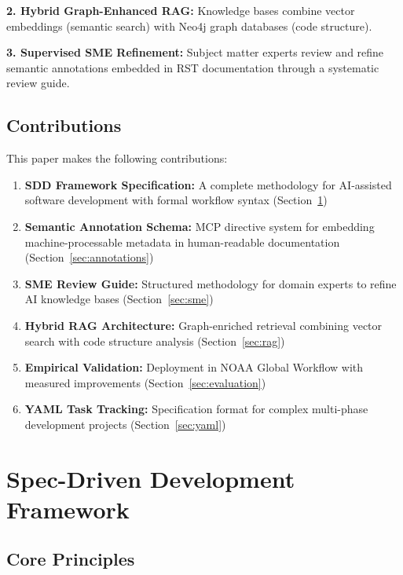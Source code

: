 \documentclass[11pt,letterpaper]{article}
\begin{document}
\textbf{2. Hybrid Graph-Enhanced RAG:} Knowledge bases combine vector embeddings (semantic search) with Neo4j graph databases (code structure).

\textbf{3. Supervised SME Refinement:} Subject matter experts review and refine semantic annotations embedded in RST documentation through a systematic review guide.

\subsection{Contributions}

This paper makes the following contributions:

\begin{enumerate}
    \item \textbf{SDD Framework Specification:} A complete methodology for AI-assisted software development with formal workflow syntax (Section~\ref{sec:sdd})
    
    \item \textbf{Semantic Annotation Schema:} MCP directive system for embedding machine-processable metadata in human-readable documentation (Section~\ref{sec:annotations})
    
    \item \textbf{SME Review Guide:} Structured methodology for domain experts to refine AI knowledge bases (Section~\ref{sec:sme})
    
    \item \textbf{Hybrid RAG Architecture:} Graph-enriched retrieval combining vector search with code structure analysis (Section~\ref{sec:rag})
    
    \item \textbf{Empirical Validation:} Deployment in NOAA Global Workflow with measured improvements (Section~\ref{sec:evaluation})
    
    \item \textbf{YAML Task Tracking:} Specification format for complex multi-phase development projects (Section~\ref{sec:yaml})
\end{enumerate}

\section{Spec-Driven Development Framework}
\label{sec:sdd}

\subsection{Core Principles}
\end{document}
